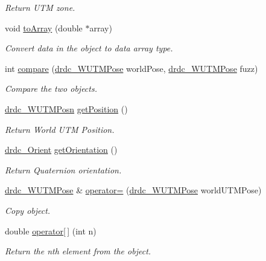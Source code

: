 \begin{CompactItemize}
\begin{CompactList}\small\item\em Return UTM zone. \item\end{CompactList}\item 
void \hyperlink{classdrdc__WUTMPose_2f1f5dda8f09010eb6a17179f5031236}{toArray} (double $\ast$array)
\begin{CompactList}\small\item\em Convert data in the object to data array type. \item\end{CompactList}\item 
int \hyperlink{classdrdc__WUTMPose_b891de95d9a341b347fa16f0d93dfdf7}{compare} (\hyperlink{classdrdc__WUTMPose}{drdc\_\-WUTMPose} worldPose, \hyperlink{classdrdc__WUTMPose}{drdc\_\-WUTMPose} fuzz)
\begin{CompactList}\small\item\em Compare the two objects. \item\end{CompactList}\item 
\hyperlink{classdrdc__WUTMPosn}{drdc\_\-WUTMPosn} \hyperlink{classdrdc__WUTMPose_2c223ece264489cf30d8dfbb173649d0}{getPosition} ()
\begin{CompactList}\small\item\em Return World UTM Position. \item\end{CompactList}\item 
\hyperlink{classdrdc__Orient}{drdc\_\-Orient} \hyperlink{classdrdc__WUTMPose_1eb7b922ae53d759a87d5d2ccb8ca12a}{getOrientation} ()
\begin{CompactList}\small\item\em Return Quaternion orientation. \item\end{CompactList}\item 
\hyperlink{classdrdc__WUTMPose}{drdc\_\-WUTMPose} \& \hyperlink{classdrdc__WUTMPose_686de4656f46487e97a18d93d47417b5}{operator=} (\hyperlink{classdrdc__WUTMPose}{drdc\_\-WUTMPose} worldUTMPose)
\begin{CompactList}\small\item\em Copy object. \item\end{CompactList}\item 
double \hyperlink{classdrdc__WUTMPose_e3851920a2524a29a89ddfc8915cac57}{operator\mbox{[}$\,$\mbox{]}} (int n)
\begin{CompactList}\small\item\em Return the nth element from the object. \item\end{CompactList}\item 

\end{CompactItemize}
